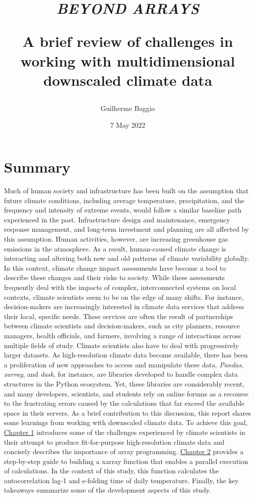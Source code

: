 \documentclass[
]{book}
\title{\emph{BEYOND ARRAYS}

A brief review of challenges in working with multidimensional downscaled climate data}
\author{Guilherme Baggio}
\date{7 May 2022}
\begin{document}
\maketitle

{
\setcounter{tocdepth}{1}
\tableofcontents
}
\hypertarget{summary}{%
\chapter*{Summary}\label{summary}}

Much of human society and infrastructure has been built on the assumption that future climate conditions, including average temperature, precipitation, and the frequency and intensity of extreme events, would follow a similar baseline path experienced in the past. Infrastructure design and maintenance, emergency response management, and long-term investment and planning are all affected by this assumption. Human activities, however, are increasing greenhouse gas emissions in the atmosphere. As a result, human-caused climate change is interacting and altering both new and old patterns of climate variability globally. In this context, climate change impact assessments have become a tool to describe these changes and their risks to society. While these assessments frequently deal with the impacts of complex, interconnected systems on local contexts, climate scientists seem to be on the edge of many shifts. For instance, decision-makers are increasingly interested in climate data services that address their local, specific needs. These services are often the result of partnerships between climate scientists and decision-makers, such as city planners, resource managers, health officials, and farmers, involving a range of interactions across multiple fields of study. Climate scientists also have to deal with progressively larger datasets. As high-resolution climate data become available, there has been a proliferation of new approaches to access and manipulate these data. \emph{Pandas}, \emph{xarray}, and \emph{dask}, for instance, are libraries developed to handle complex data structures in the Python ecosystem. Yet, these libraries are considerably recent, and many developers, scientists, and students rely on online forums as a recourse to the frustrating errors caused by the calculations that far exceed the available space in their servers. As a brief contribution to this discussion, this report shares some learnings from working with downscaled climate data. To achieve this goal, \protect\hyperlink{introduction}{Chapter 1} introduces some of the challenges experienced by climate scientists in their attempt to produce fit-for-purpose high-resolution climate data and concisely describes the importance of array programming. \protect\hyperlink{building-a-function-in-xarray}{Chapter 2} provides a step-by-step guide to building a xarray function that enables a parallel execution of calculations. In the context of this study, this function calculates the autocorrelation lag-1 and e-folding time of daily temperature. Finally, the key takeaways summarize some of the development aspects of this study.
\end{document}
